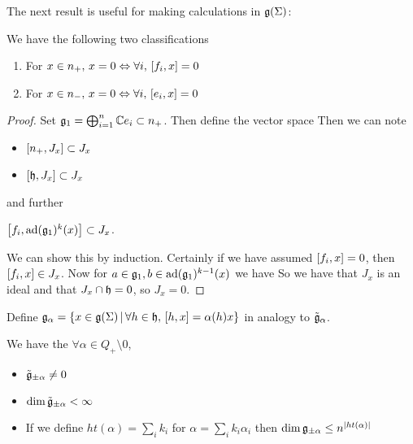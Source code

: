 \documentclass{article}
\begin{document}
The next result is useful for making calculations in $\mf{g}(\Sigma)$:

\begin{lemma}
	We have the following two classifications
	\begin{enumerate}
		\item For $x \in n_+, \, x=0 \Leftrightarrow \forall i, \, \comm[f_i]{x} = 0$
		\item For $x \in n_-, \, x=0 \Leftrightarrow \forall i, \, \comm[e_i]{x} = 0$
	\end{enumerate}
\end{lemma}
\begin{proof}
	Set $\mf{g}_1 = \bigoplus_{i=1}^n \mbb{C} e_i \subset n_+$. Then define the vector space 
	Then we can note 
	\begin{itemize}
		\item $\comm[n_+]{J_x} \subset J_x$
		\item $\comm[\mf{h}]{J_x} \subset J_x$
	\end{itemize}
	and further 
	\begin{claim}
		$\comm[f_i]{\ad(\mf{g}_1)^k(x)} \subset J_x$.
	\end{claim}
	We can show this by induction. Certainly if we have assumed $\comm[f_i]{x} = 0$, then $\comm[f_i]{x} \in J_x$. Now for $a \in \mf{g}_1, b \in \ad(\mf{g}_1)^{k-1}(x)$ we have 
	So we have that $J_x$ is an ideal and that $J_x \cap \mf{h} = 0$, so $J_x= 0$. 
\end{proof}

\begin{definition}
Define $\mf{g}_\alpha = \pbrace{x \in \mf{g}(\Sigma) \, | \, \forall h \in \mf{h}, \, \comm[h]{x} = \alpha(h)x}$ in analogy to $\tilde{\mf{g}}_\alpha$.
\end{definition}

\begin{remark}
We have the $\forall \alpha \in Q_+ \setminus 0$, 
\begin{itemize}
    \item $\tilde{\mf{g}}_{\pm\alpha} \neq 0$
    \item $\dim \tilde{\mf{g}}_{\pm\alpha}<\infty$
    \item If we define $ht(\alpha) = \sum_i k_i$ for $\alpha = \sum_i k_i \alpha_i$ then $\dim\mf{g}_{\pm\alpha} \leq n^{\abs{ht(\alpha)}}$
\end{itemize}
\end{remark}
\end{document}
